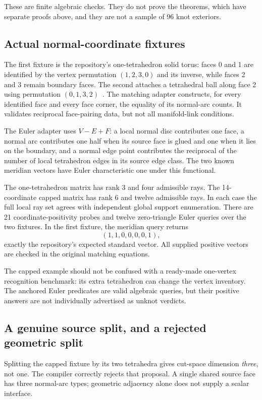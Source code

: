 These are finite algebraic checks. They do not prove the theorems, which have
separate proofs above, and they are not a sample of 96 knot exteriors.

\subsection{Actual normal-coordinate fixtures}

The first fixture is the repository's one-tetrahedron solid torus: faces 0 and
1 are identified by the vertex permutation $(1,2,3,0)$ and its inverse, while
faces 2 and 3 remain boundary faces. The second attaches a tetrahedral ball
along face 2 using permutation $(0,1,3,2)$~\cite{repofixture}.
The matching adapter constructs, for every identified face and every face
corner, the equality of its normal-arc counts. It validates reciprocal
face-pairing data, but not all manifold-link conditions.

The Euler adapter uses $V-E+F$: a local normal disc contributes one face,
a normal arc contributes one half when its source face is glued and one when
it lies on the boundary, and a normal edge point contributes the reciprocal
of the number of local tetrahedron edges in its source edge class. The two
known meridian vectors have Euler characteristic one under this functional.

The one-tetrahedron matrix has rank 3 and four admissible rays. The
14-coordinate capped matrix has rank 6 and twelve admissible rays. In each
case the full local ray set agrees with independent global support enumeration.
There are 21 coordinate-positivity probes and twelve zero-triangle Euler
queries over the two fixtures. In the first fixture, the meridian query returns
\[
 (1,1,0,0,0,0,1),
\]
exactly the repository's expected standard vector. All supplied positive
vectors are checked in the original matching equations.

The capped example should not be confused with a ready-made one-vertex
recognition benchmark: its extra tetrahedron can change the vertex inventory.
The anchored Euler predicates are valid algebraic queries, but their positive
answers are not individually advertised as unknot verdicts.

\subsection{A genuine source split, and a rejected geometric split}

Splitting the capped fixture by its two tetrahedra gives cut-space dimension
\emph{three}, not one. The compiler correctly rejects that proposal. A single
shared source face has three normal-arc types; geometric adjacency alone does
not supply a scalar interface.

